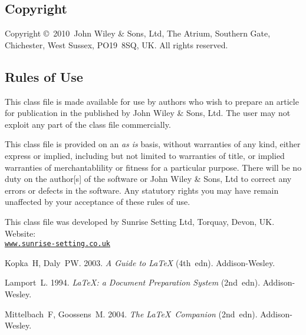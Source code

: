 \documentclass[times]{smrauth}
\def\volumeyear{2010}
\begin{document}
\subsection{Copyright}
Copyright \copyright\ \volumeyear\ John Wiley \& Sons, Ltd, The
Atrium, Southern Gate, Chichester, West Sussex, PO19~8SQ, UK. All
rights reserved.

\subsection{Rules of Use}
This class file is made available for use by authors who wish to
prepare an article for publication in the \emph{\journalnamelc}
published by John Wiley \& Sons, Ltd. The user may not exploit any
part of the class file commercially.

This class file is provided on an \emph{as is}  basis, without
warranties of any kind, either express or implied, including but
not limited to warranties of title, or implied  warranties of
merchantablility or fitness for a particular purpose. There will
be no duty on the author[s] of the software or  John Wiley \&
Sons, Ltd to correct any errors or defects in the software. Any
statutory  rights you may have remain unaffected by your
acceptance of these rules of use.

\ack This class file was developed by Sunrise Setting Ltd,
Torquay, Devon, UK. Website:\\
\href{http://www.sunrise-setting.co.uk}{\texttt{www.sunrise-setting.co.uk}}

\begin{thebibliography}{9}

 Kopka~H, Daly~PW. 2003. \emph{A Guide to \LaTeX} (4th~edn).
Addison-Wesley.

 Lamport~L. 1994. \emph{\LaTeX: a Document Preparation System} (2nd~edn).
Addison-Wesley.

 Mittelbach~F, Goossens~M. 2004. \emph{The \LaTeX\ Companion}
(2nd~edn). Addison-Wesley.
\end{thebibliography}
\end{document}
